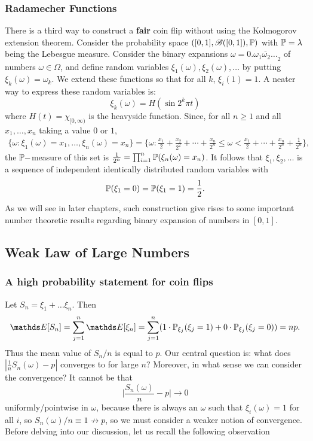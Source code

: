 \subsubsection{Radamecher Functions}
There is a third way to construct a \textbf{fair} coin flip without using the Kolmogorov extension theorem. Consider the probability space $([0,1], \mathcal{B}([0,1]), \mathbb{P})$ with $\mathbb{P} = \lambda$ being the Lebesgue measure. Consider the binary expansions $\omega = 0.\overline{\omega_1 \omega_2 \dots}_2$ of numbers $\omega \in \Omega$, and define random variables $\xi_1(\omega), \xi_2(\omega),\dots$ by putting $\xi_k(\omega) = \omega_k$. We extend these functions so that for all $k$, $\xi_i(1) = 1$. A neater way to express these random variables is: 
\begin{equation}
\xi_k(\omega) = H(\sin 2^k \pi t)
\end{equation}
where $H(t) = \chi_{[0,\infty)}$ is the heavyside function. Since, for all $n \ge 1$ and all $x_1,\dots, x_n$ taking a value $0$ or $1$, 
\begin{align*}
    \{\omega: \xi_1(\omega) = x_1, \dots, \xi_n(\omega) = x_n \} = \bigg\{ \omega: \frac{x_1}{2} + \frac{x_2}{2^2} + \cdots + \frac{x_n}{2^n} \le \omega < \frac{x_1}{2} + \cdots + \frac{x_n}{2^n} + \frac{1}{2^n} \bigg\},
\end{align*}
the $\mathbb{P}-$measure of this set is $\frac{1}{2^n} = \prod_{i=1}^n \mathbb{P}(\xi_n(\omega) = x_n)$. It follows that $\xi_1, \xi_2, \dots$ is a sequence of independent identically distributed random variables with 
\begin{equation*}
    \mathbb{P}(\xi_1 = 0) = \mathbb{P}(\xi_1 = 1) = \frac12.
\end{equation*}
As we will see in later chapters, such construction give rises to some important number theoretic results regarding binary expansion of numbers in $[0,1]$.


\subsection{Weak Law of Large Numbers}
\subsubsection{A high probability statement for coin flips}
Let $S_n = \xi_1 + \dots \xi_n$. Then 
\begin{equation*}
    \E[S_n] = \sum_{j=1}^n \E[\xi_n] = \sum_{j=1}^n(1 \cdot \p_{\xi_j}(\xi_j = 1) + 0\cdot \p_{\xi_j}(\xi_j = 0)) = np.
\end{equation*}
Thus the mean value of $S_n/n$ is equal to $p$. Our central question is: what does $|\frac{1}{n}S_n(\omega) - p|$ converges to for large $n$? Moreover, in what sense we can consider the convergence? It cannot be that
\begin{equation*}
    \bigg|\frac{S_n(\omega)}{n} - p\bigg| \rightarrow 0
\end{equation*}
uniformly/pointwise in $\omega$, because there is always an $\omega$ such that $\xi_i(\omega) = 1$ for all $i$, so $S_n(\omega)/n \equiv 1 \nrightarrow p$, so we must consider a weaker notion of convergence. Before delving into our discussion, let us recall the following observation

